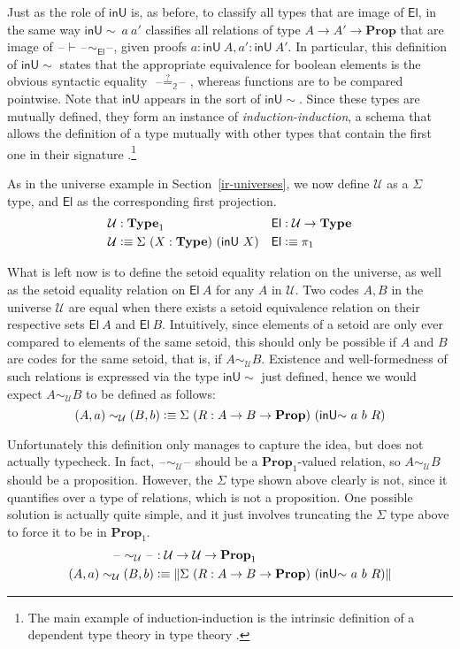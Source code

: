 \documentclass[autoref]{llncs}
\newcommand{\setoidU}{\mathcal{U}}
\newcommand{\inU}{\mathsf{inU}}
\newcommand{\inUU}{\mathsf{inU{\sim}}}
\newcommand{\mType}{\mathbf{Type}}
\newcommand{\mProp}{\mathbf{Prop}}
\newcommand{\El}{\textsf{El}}
\providecommand\mathbbm{\mathbb}
\newcommand{\blank}{\mathord{\hspace{1pt}\text{--}\hspace{1pt}}}
\newcommand{\defeq}{\mathrel{\vcentcolon\equiv}}
\begin{document}
Just as the role of $\inU$ is, as before, to classify all types that are image
of $\El$, in the same way $\inUU\ a\ a'$ classifies all relations of type $A \to
A' \to \mProp$ that are image of $\blank\vdash\blank\sim_{\El}\blank$, given proofs $a :
\inU\ A, a' : \inU\ A'$.
%
In particular, this definition of $\inUU$ states that the appropriate
equivalence for boolean elements is the obvious syntactic equality
$\blank\stackrel{?}{=}_{\mathbbm{2}}\blank$, whereas functions are to be compared
pointwise.
%
Note that $\inU$ appears in the sort of $\inUU$. Since these types are
mutually defined, they form an instance of \emph{induction-induction}, a schema
that allows the definition of a type mutually with other types that contain the
first one in their signature \cite{ii}.\footnote{The main example of
  induction-induction is the intrinsic definition of a dependent type theory in
  type theory \cite{tt-in-tt}.}

As in the universe example in Section~\ref{ir-universes}, we now define
$\setoidU$ as a $\Sigma$ type, and $\El$ as the corresponding first projection.
\vspace{-0.2em}
\begin{align*}
  \setoidU & : \mType_1 & \El &: \setoidU \to \mType \\
  \setoidU & \defeq \Sigma\ (X : \mType)\ (\inU\ X) & \El &\defeq \pi_1
\end{align*}

What is left now is to define the setoid equality relation on the universe, as
well as the setoid equality relation on $\El\ A$ for any $A$ in $\setoidU$.
%
Two codes $A, B$ in the universe $\setoidU$ are equal when there exists a setoid
equivalence relation on their respective sets $\El\ A$ and $\El\ B$. Intuitively,
since elements of a setoid are only ever compared to elements of the same
setoid, this should only be possible if $A$ and $B$ are codes for the same setoid,
that is, if $A \sim_{\setoidU} B$. Existence and well-formedness of such
relations is expressed via the type $\inUU$ just defined, hence we would
expect $A \sim_{\setoidU} B$ to be defined as follows:
\[
(A, a) \sim_{\setoidU} (B, b) \defeq \Sigma\ (R: A \to B \to \mProp)\ (\inUU\ a\ b\ R)
\]

Unfortunately this definition only manages to capture the idea, but does not
actually typecheck. In fact, $\blank\sim_{\setoidU}\blank$ should be a $\mProp_1$-valued
relation, so $A \sim_{\setoidU} B$ should be a proposition. However, the
$\Sigma$ type shown above clearly is not, since it quantifies over a type of
relations, which is not a proposition.
%
One possible solution is actually quite simple, and it just involves truncating
the $\Sigma$ type above to force it to be in $\mProp_1$.
\vspace{-0.2em}
\begin{align*}
  \blank\sim_{\setoidU}\blank &: \setoidU \to \setoidU \to \mProp_1 \\
  (A , a) \sim_{\setoidU} (B , b) &\defeq
   \| \Sigma\ (R : A \to B \to \mProp)\ (\inUU\ a\ b\ R) \|
\end{align*}
\end{document}
